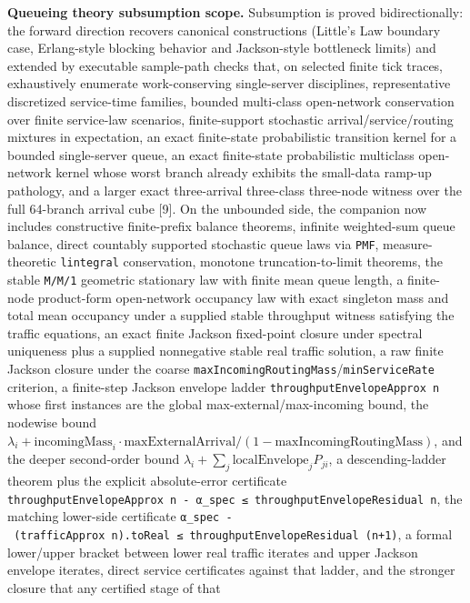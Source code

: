 \documentclass[
  11pt,
]{article}
\begin{document}
\textbf{Queueing theory subsumption scope.} Subsumption is proved
bidirectionally: the forward direction recovers canonical constructions
(Little's Law boundary case, Erlang-style blocking behavior and
Jackson-style bottleneck limits) and extended by executable sample-path
checks that, on selected finite tick traces, exhaustively enumerate
work-conserving single-server disciplines, representative discretized
service-time families, bounded multi-class open-network conservation
over finite service-law scenarios, finite-support stochastic
arrival/service/routing mixtures in expectation, an exact finite-state
probabilistic transition kernel for a bounded single-server queue, an
exact finite-state probabilistic multiclass open-network kernel whose
worst branch already exhibits the small-data ramp-up pathology, and a
larger exact three-arrival three-class three-node witness over the full
64-branch arrival cube {[}9{]}. On the unbounded side, the companion now
includes constructive finite-prefix balance theorems, infinite
weighted-sum queue balance, direct countably supported stochastic queue
laws via \texttt{PMF}, measure-theoretic \texttt{lintegral}
conservation, monotone truncation-to-limit theorems, the stable
\texttt{M/M/1} geometric stationary law with finite mean queue length, a
finite-node product-form open-network occupancy law with exact singleton
mass and total mean occupancy under a supplied stable throughput witness
satisfying the traffic equations, an exact finite Jackson fixed-point
closure under spectral uniqueness plus a supplied nonnegative stable
real traffic solution, a raw finite Jackson closure under the coarse
\texttt{maxIncomingRoutingMass}/\texttt{minServiceRate} criterion, a
finite-step Jackson envelope ladder \texttt{throughputEnvelopeApprox\ n}
whose first instances are the global max-external/max-incoming bound,
the nodewise bound
\(\lambda_i + \mathrm{incomingMass}_i \cdot \mathrm{maxExternalArrival} / (1-\mathrm{maxIncomingRoutingMass})\),
and the deeper second-order bound
\(\lambda_i + \sum_j \mathrm{localEnvelope}_j P_{j i}\), a
descending-ladder theorem plus the explicit absolute-error certificate
\texttt{throughputEnvelopeApprox\ n\ -\allowbreak{}\ α\_spec\ ≤\ throughputEnvelopeResidual\ n},
the matching lower-side certificate
\texttt{α\_spec\ -\allowbreak{}\ (trafficApprox\ n).\allowbreak{}toReal\ ≤\ throughputEnvelopeResidual\ (n+1)},
a formal lower/upper bracket between lower real traffic iterates and
upper Jackson envelope iterates, direct service certificates against
that ladder, and the stronger closure that any certified stage of that
\end{document}

